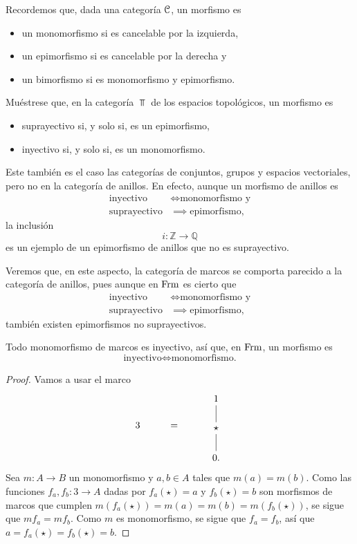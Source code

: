 Recordemos que, dada una categoría $\cal C$, un morfismo es
\begin{itemize}
    \item un monomorfismo si es cancelable por la izquierda,
    \item un epimorfismo si es cancelable por la derecha y
    \item un bimorfismo si es monomorfismo y epimorfismo.
\end{itemize}

\begin{exercise}%
    Muéstrese que, en la categoría $\Top$ de los espacios topológicos,
    un morfismo es
    \begin{itemize}
        \item suprayectivo si, y solo si, es un epimorfismo,
        \item inyectivo si, y solo si, es un monomorfismo.
    \end{itemize}
\end{exercise}

Este también es el caso las categorías de conjuntos, grupos y
espacios vectoriales, pero no en la categoría de anillos.
En efecto, aunque un morfismo de anillos es
\begin{align*}
    \text{inyectivo} &\iff \text{monomorfismo y} \\
    \text{suprayectivo} &\implies \text{epimorfismo},
\end{align*}
la inclusión
\[
    i:\mathbb Z\to\mathbb Q
\]
es un ejemplo de un epimorfismo de anillos que no es suprayectivo.

Veremos que, en este aspecto, la categoría de marcos se comporta
parecido a la categoría de anillos, pues aunque en $\Frm$ es cierto que
\begin{align*}
    \text{inyectivo} &\iff \text{monomorfismo y} \\
    \text{suprayectivo} &\implies \text{epimorfismo},
\end{align*}
también existen epimorfismos no suprayectivos.

\begin{lemma}
    Todo monomorfismo de marcos es inyectivo,
    así que, en $\Frm$, un morfismo es
    \[
        \text{inyectivo} \iff \text{monomorfismo.}
    \]
\end{lemma}
\begin{proof}
    Vamos a usar el marco
    \[
        3 \hspace{10mm} = \hspace{10mm}
        \begin{tikzcd}
            1 \\ \star \ar[u,no head] \\ 0. \ar[u,no head]
        \end{tikzcd}
    \]
    Sea $m:A\to B$ un monomorfismo y $a,b\in A$ tales que $m(a)=m(b)$.
    Como las funciones $f_a,f_b:3\to A$ dadas por
    $f_a(\star)=a$ y $f_b(\star)=b$ son morfismos de marcos que cumplen
    $m(f_a(\star))=m(a)=m(b)=m(f_b(\star))$, se sigue que $mf_a=mf_b$.
    Como $m$ es monomorfismo, se sigue que $f_a=f_b$, así que
    $a=f_a(\star)=f_b(\star)=b$.
\end{proof}

